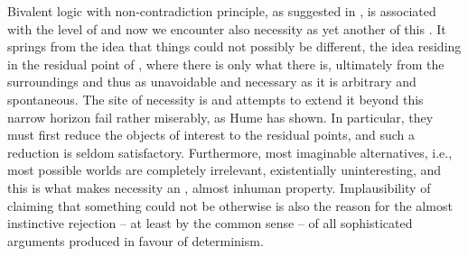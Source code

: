 Bivalent logic with non-contradiction principle, as suggested in
, is associated with the level of  and now we
encounter also necessity as yet another  of this \nexus. It springs
from the idea that things could not possibly be different, the idea residing in
the residual point of , where there is only what there is, ultimately
 from the surroundings and thus as unavoidable and necessary as
it is arbitrary and spontaneous. The site of necessity is  and
attempts to extend it beyond this narrow horizon fail rather miserably, as Hume
has shown. In particular, they must first reduce the objects of
interest to the residual points, and such a reduction is seldom satisfactory.
Furthermore, most imaginable alternatives, i.e., most possible worlds are
completely irrelevant, existentially uninteresting, and this is what makes
necessity an , almost inhuman property.  Implausibility of
claiming that something could not be otherwise is also the reason for the almost
instinctive rejection -- at least by the common sense -- of all sophisticated
arguments produced in favour of determinism.

